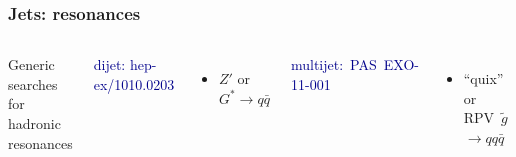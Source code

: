 \documentclass[compress]{beamer}
\begin{document}
\begin{frame}
\frametitle{Jets: resonances}

\begin{columns}

Generic searches for hadronic resonances

\textcolor{darkblue}{\scriptsize dijet: hep-ex/1010.0203}
\begin{itemize}
\item $Z'$ or $G^* \to q\bar{q}$
\end{itemize}

\textcolor{darkblue}{\scriptsize \mbox{multijet: PAS EXO-11-001\hspace{-1 cm}}}
\begin{itemize}
\item ``quix'' or {\scriptsize RPV}~$\tilde{g}$ \\ \hfill $\to qq\bar{q}$
\end{itemize}

\includegraphics[width=\linewidth]{figures/dijet_trijet.pdf}
\end{columns}

\vfill
{}
\end{frame}
\end{document}
